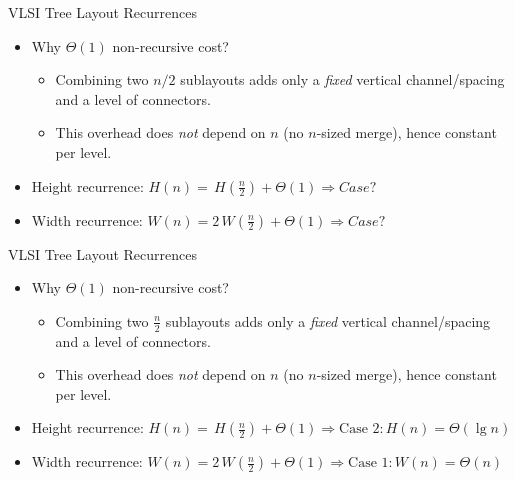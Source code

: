 \documentclass{beamer}
\begin{document}
\begin{frame}{VLSI Tree Layout Recurrences}
    \begin{itemize}
    \item Why $\Theta(1)$ non-recursive cost?
        \begin{itemize}
        \item Combining two $n/2$ sublayouts adds only a \emph{fixed} vertical channel/spacing and a level of connectors.
        \item This overhead does \emph{not} depend on $n$ (no $n$-sized merge), hence constant per level.
        \end{itemize}
    \item Height recurrence:
        \(
            H(n)=\,H(\frac{n}{2})+\Theta(1)\Rightarrow Case ? %
        \)
    \item Width recurrence: \(
        W(n)=2\,W(\frac{n}{2})+\Theta(1)\Rightarrow Case ?%
        \)
    \end{itemize}
\end{frame}

\begin{frame}{VLSI Tree Layout Recurrences}
    \begin{itemize}
    \item Why $\Theta(1)$ non-recursive cost?
        \begin{itemize}
        \item Combining two $\frac{n}{2}$ sublayouts adds only a \emph{fixed} vertical channel/spacing and a level of connectors.
        \item This overhead does \emph{not} depend on $n$ (no $n$-sized merge), hence constant per level.
        \end{itemize}
    \item Height recurrence:
        \(
            H(n)=\,H(\frac{n}{2})+\Theta(1)\Rightarrow \text{Case 2}: H(n)=\Theta(\lg n)
        \)
    \item Width recurrence: \(
        W(n)=2\,W(\frac{n}{2})+\Theta(1)\Rightarrow \text{Case 1}: W(n)=\Theta(n)
        \)
    \end{itemize}
\end{frame}
\end{document}
